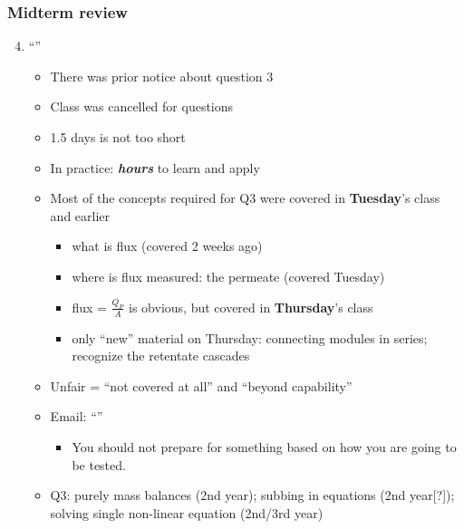 \begin{frame}\frametitle{Midterm review}
	\begin{enumerate}
		\setcounter{enumi}{3}
		\item	``{\color{myOrange}{Unfair}}''
		\begin{itemize}
			\item	There was prior notice about question 3
			\item	Class was cancelled for questions
			\item	1.5 days is not too short
			\item	In practice: \textbf{\emph{hours}} to learn and apply
			\item	Most of the concepts required for Q3 were covered in \textbf{Tuesday}'s class and earlier
			\begin{itemize}
				\item	what is flux (covered 2 weeks ago)
				\item	where is flux measured: the permeate (covered Tuesday)
				\item	flux = $\displaystyle \frac{Q_P}{A}$ is obvious, but covered in \textbf{Thursday}'s class
				\item	only ``new'' material on Thursday: connecting modules in series; recognize the retentate cascades
			\end{itemize}
			\item	Unfair = ``not covered at all'' and ``beyond capability''
			\item	Email: ``{\color{myOrange}{The course this year is very different from the past years making it almost impossible to prepare well for it. All we have is the examples you did in class and the assignments.}}''
			\begin{itemize}
				\item	You should not prepare for something based on how you are going to be tested.
			\end{itemize}
			\item	Q3: purely mass balances (2nd year); subbing in equations (2nd year[?]); solving single non-linear equation (2nd/3rd year)
		\end{itemize}
	\end{enumerate}
\end{frame}


